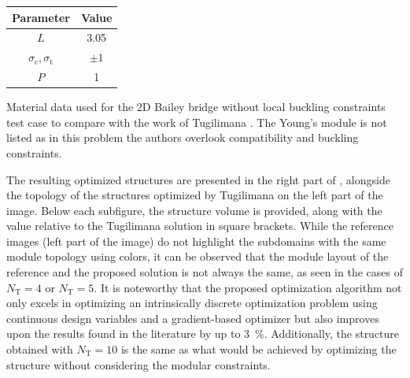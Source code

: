 \begin{margintable}
    \small
    \centering
    \begin{tabular}{cc}
    \toprule
    \textbf{Parameter}        & \textbf{Value} \\ \midrule
    $L$              & 3.05     \\
    $\sigma_\text{c}, \sigma_\text{t}$ & $\pm 1$\\
    $P$              & 1   \\
    \bottomrule
    \end{tabular}
    \caption{Material data used for the 2D Bailey bridge without local buckling constraints test case to compare with the work of Tugilimana \etal \cite{tugilimana_integrated_2019}. The Young's module is not listed as in this problem the authors overlook compatibility and buckling constraints.}
    \label{tab:06_modular_tug}
\end{margintable}

The resulting optimized structures are presented in the right part of , alongside the topology of the structures optimized by Tugilimana \etal {} on the left part of the image. Below each subfigure, the structure volume is provided, along with the value relative to the Tugilimana solution in square brackets. While the reference images (left part of the image) do not highlight the subdomains with the same module topology using colors, it can be observed that the module layout of the reference and the proposed solution is not always the same, as seen in the cases of $N_\text{T}=4$ or $N_\text{T}=5$. It is noteworthy that the proposed optimization algorithm not only excels in optimizing an intrinsically discrete optimization problem using continuous design variables and a gradient-based optimizer but also improves upon the results found in the literature by up to \qty{3}{\percent}. Additionally, the structure obtained with $N_\text{T}=10$ is the same as what would be achieved by optimizing the structure without considering the modular constraints.

